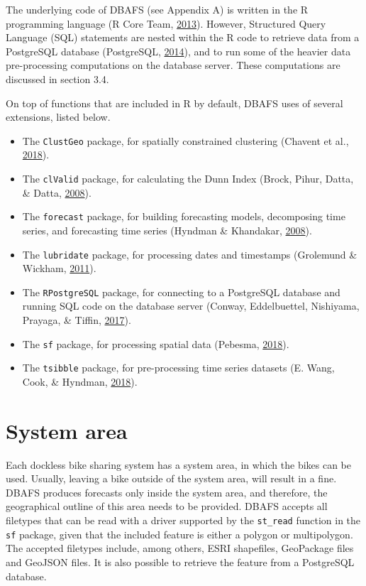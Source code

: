 \documentclass[12pt,oneside]{reedthesis}
\providecommand{\tightlist}{%
  \setlength{\itemsep}{0pt}\setlength{\parskip}{0pt}}
\begin{document}
The underlying code of DBAFS (see Appendix A) is written in the R
programming language (R Core Team,
\protect\hyperlink{ref-rlanguage}{2013}). However, Structured Query
Language (SQL) statements are nested within the R code to retrieve data
from a PostgreSQL database (PostgreSQL,
\protect\hyperlink{ref-postgres}{2014}), and to run some of the heavier
data pre-processing computations on the database server. These
computations are discussed in section 3.4.

On top of functions that are included in R by default, DBAFS uses of
several extensions, listed below.
\begin{itemize}
\tightlist
\item
  The \texttt{ClustGeo} package, for spatially constrained clustering
  (Chavent et al., \protect\hyperlink{ref-clustgeo}{2018}).
\item
  The \texttt{clValid} package, for calculating the Dunn Index (Brock,
  Pihur, Datta, \& Datta, \protect\hyperlink{ref-clValid}{2008}).
\item
  The \texttt{forecast} package, for building forecasting models,
  decomposing time series, and forecasting time series (Hyndman \&
  Khandakar, \protect\hyperlink{ref-forecast}{2008}).
\item
  The \texttt{lubridate} package, for processing dates and timestamps
  (Grolemund \& Wickham, \protect\hyperlink{ref-lubridate}{2011}).
\item
  The \texttt{RPostgreSQL} package, for connecting to a PostgreSQL
  database and running SQL code on the database server (Conway,
  Eddelbuettel, Nishiyama, Prayaga, \& Tiffin,
  \protect\hyperlink{ref-RPostgreSQL}{2017}).
\item
  The \texttt{sf} package, for processing spatial data (Pebesma,
  \protect\hyperlink{ref-sf}{2018}).
\item
  The \texttt{tsibble} package, for pre-processing time series datasets
  (E. Wang, Cook, \& Hyndman, \protect\hyperlink{ref-tsibble}{2018}).
\end{itemize}
\section{System area}\label{system-area}

Each dockless bike sharing system has a system area, in which the bikes
can be used. Usually, leaving a bike outside of the system area, will
result in a fine. DBAFS produces forecasts only inside the system area,
and therefore, the geographical outline of this area needs to be
provided. DBAFS accepts all filetypes that can be read with a driver
supported by the \texttt{st\_read} function in the \texttt{sf} package,
given that the included feature is either a polygon or multipolygon. The
accepted filetypes include, among others, ESRI shapefiles, GeoPackage
files and GeoJSON files. It is also possible to retrieve the feature
from a PostgreSQL database.
\end{document}
